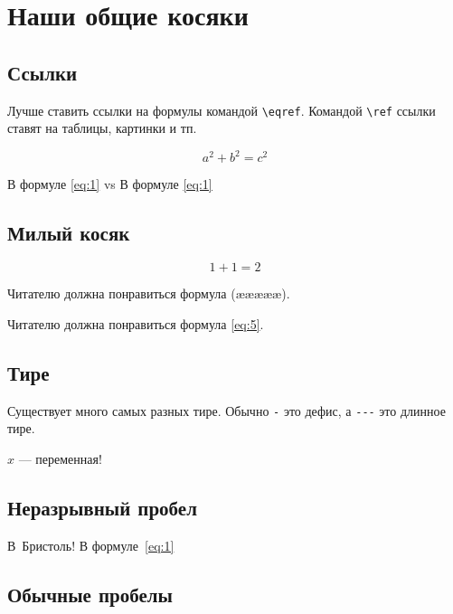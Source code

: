 \documentclass[12pt, a4paper]{article}
\begin{document}
 

\section{Наши общие косяки} 

\subsection{Ссылки}

Лучше ставить ссылки на формулы командой \verb|\eqref|. Командой \verb|\ref| ссылки ставят на таблицы, картинки и тп. 

\begin{equation}
a^2+b^2=c^2\label{eq:1}
\end{equation}

В формуле \eqref{eq:1} vs В формуле  \ref{eq:1}

\subsection{Милый косяк}

\begin{equation} \label{eq:5} 
1 + 1 = 2
\tag{ææææ}
\end{equation}

Читателю должна понравиться формула (æææææ). 

Читателю должна понравиться формула \eqref{eq:5}. 


\subsection{Тире}


Существует много самых разных тире.  Обычно 
\verb|-| это дефис, а \verb|---| это длинное тире.

$x$ --- переменная!

\subsection{Неразрывный пробел}

В~Бристоль!  В формуле~\eqref{eq:1}

\subsection{Обычные пробелы}
\end{document}
